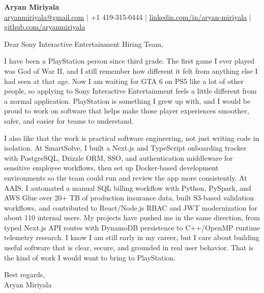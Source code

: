 \documentclass[11pt]{letter}
\begin{document}
\begin{center}
{\Large \textbf{Aryan Miriyala}}\\
\href{mailto:aryanmiriyala@gmail.com}{aryanmiriyala@gmail.com} $|$ +1 419-315-0444 $|$
\href{https://www.linkedin.com/in/aryan-miriyala-7788a21b6/}{linkedin.com/in/aryan-miriyala} $|$
\href{https://github.com/aryanmiriyala}{github.com/aryanmiriyala}
\end{center}

\vspace{0.18in}

Dear Sony Interactive Entertainment Hiring Team,

I have been a PlayStation person since third grade. The first game I ever played was God of War II, and I still remember how different it felt from anything else I had seen at that age. Now I am waiting for GTA 6 on PS5 like a lot of other people, so applying to Sony Interactive Entertainment feels a little different from a normal application. PlayStation is something I grew up with, and I would be proud to work on software that helps make those player experiences smoother, safer, and easier for teams to understand.

I also like that the work is practical software engineering, not just writing code in isolation. At SmartSolve, I built a Next.js and TypeScript onboarding tracker with PostgreSQL, Drizzle ORM, SSO, and authentication middleware for sensitive employee workflows, then set up Docker-based development environments so the team could run and review the app more consistently. At AAIS, I automated a manual SQL billing workflow with Python, PySpark, and AWS Glue over 20+ TB of production insurance data, built S3-based validation workflows, and contributed to React/Node.js RBAC and JWT modernization for about 110 internal users. My projects have pushed me in the same direction, from typed Next.js API routes with DynamoDB persistence to C++/OpenMP runtime telemetry research. I know I am still early in my career, but I care about building useful software that is clear, secure, and grounded in real user behavior. That is the kind of work I would want to bring to PlayStation.

\vspace{0.10in}

Best regards,\\
Aryan Miriyala
\end{document}
